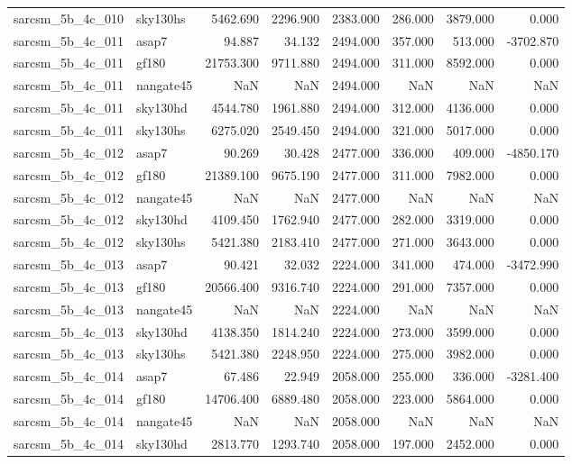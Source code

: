 \begin{tabular}{llrrrrrr}
sarcsm\_5b\_4c\_010 & sky130hs & 5462.690 & 2296.900 & 2383.000 & 286.000 & 3879.000 & 0.000 \\
sarcsm\_5b\_4c\_011 & asap7 & 94.887 & 34.132 & 2494.000 & 357.000 & 513.000 & -3702.870 \\
sarcsm\_5b\_4c\_011 & gf180 & 21753.300 & 9711.880 & 2494.000 & 311.000 & 8592.000 & 0.000 \\
sarcsm\_5b\_4c\_011 & nangate45 & NaN & NaN & 2494.000 & NaN & NaN & NaN \\
sarcsm\_5b\_4c\_011 & sky130hd & 4544.780 & 1961.880 & 2494.000 & 312.000 & 4136.000 & 0.000 \\
sarcsm\_5b\_4c\_011 & sky130hs & 6275.020 & 2549.450 & 2494.000 & 321.000 & 5017.000 & 0.000 \\
sarcsm\_5b\_4c\_012 & asap7 & 90.269 & 30.428 & 2477.000 & 336.000 & 409.000 & -4850.170 \\
sarcsm\_5b\_4c\_012 & gf180 & 21389.100 & 9675.190 & 2477.000 & 311.000 & 7982.000 & 0.000 \\
sarcsm\_5b\_4c\_012 & nangate45 & NaN & NaN & 2477.000 & NaN & NaN & NaN \\
sarcsm\_5b\_4c\_012 & sky130hd & 4109.450 & 1762.940 & 2477.000 & 282.000 & 3319.000 & 0.000 \\
sarcsm\_5b\_4c\_012 & sky130hs & 5421.380 & 2183.410 & 2477.000 & 271.000 & 3643.000 & 0.000 \\
sarcsm\_5b\_4c\_013 & asap7 & 90.421 & 32.032 & 2224.000 & 341.000 & 474.000 & -3472.990 \\
sarcsm\_5b\_4c\_013 & gf180 & 20566.400 & 9316.740 & 2224.000 & 291.000 & 7357.000 & 0.000 \\
sarcsm\_5b\_4c\_013 & nangate45 & NaN & NaN & 2224.000 & NaN & NaN & NaN \\
sarcsm\_5b\_4c\_013 & sky130hd & 4138.350 & 1814.240 & 2224.000 & 273.000 & 3599.000 & 0.000 \\
sarcsm\_5b\_4c\_013 & sky130hs & 5421.380 & 2248.950 & 2224.000 & 275.000 & 3982.000 & 0.000 \\
sarcsm\_5b\_4c\_014 & asap7 & 67.486 & 22.949 & 2058.000 & 255.000 & 336.000 & -3281.400 \\
sarcsm\_5b\_4c\_014 & gf180 & 14706.400 & 6889.480 & 2058.000 & 223.000 & 5864.000 & 0.000 \\
sarcsm\_5b\_4c\_014 & nangate45 & NaN & NaN & 2058.000 & NaN & NaN & NaN \\
sarcsm\_5b\_4c\_014 & sky130hd & 2813.770 & 1293.740 & 2058.000 & 197.000 & 2452.000 & 0.000 \\

\end{tabular}
